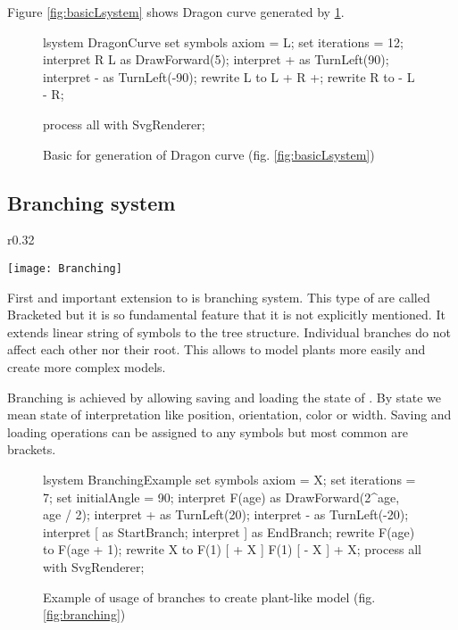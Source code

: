 Figure \ref{fig:basicLsystem} shows Dragon curve generated by \dzerolsystem \ref{fig:basicLsystemSrc}.

\begin{figure}[ht]
	\begin{Lsystem}
lsystem DragonCurve {
	set symbols axiom = L;
	set iterations = 12;
	interpret R L as DrawForward(5);
	interpret + as TurnLeft(90);
	interpret - as TurnLeft(-90);
	rewrite L to L + R +;
	rewrite R to - L - R;
}

process all with SvgRenderer;
	\end{Lsystem}
	\caption{Basic \dzerolsystem for generation of Dragon curve (fig. \ref{fig:basicLsystem})}
	\label{fig:basicLsystemSrc}
\end{figure}



\subsection{Branching system}

\begin{wrapfigure}{r}{0.32\textwidth}
	\vspace{-40pt}
	\begin{center}
	\texttt{[image: Branching]}
	\end{center}
	\caption{Plant}
	\label{fig:branching}
\end{wrapfigure}

First and important extension to \lsystems is branching system.
This type of \lsystems are called Bracketed \lsystems\cite{PL91} but it is so fundamental feature that it is not explicitly mentioned.
It extends linear string of symbols to the tree structure.
Individual branches do not affect each other nor their root.
This allows to model plants more easily and create more complex models.

Branching is achieved by allowing saving and loading the state of \lsystem.
By state we mean state of interpretation like position, orientation, color or width.
Saving and loading operations can be assigned to any symbols but most common are brackets.

\begin{figure}[ht]
	\begin{Lsystem}
lsystem BranchingExample {
	set symbols axiom = X;
	set iterations = 7;
	set initialAngle = 90;
	interpret F(age) as DrawForward(2^age, age / 2);
	interpret + as TurnLeft(20);
	interpret - as TurnLeft(-20);
	interpret [ as StartBranch;
	interpret ] as EndBranch;
	rewrite F(age) to F(age + 1);
	rewrite X to F(1) [ + X ] F(1) [ - X ] + X;
}
process all with SvgRenderer;
	\end{Lsystem}
	\caption{Example of usage of branches to create plant-like model (fig. \ref{fig:branching})}
	\label{fig:branchingSrc}
\end{figure}



